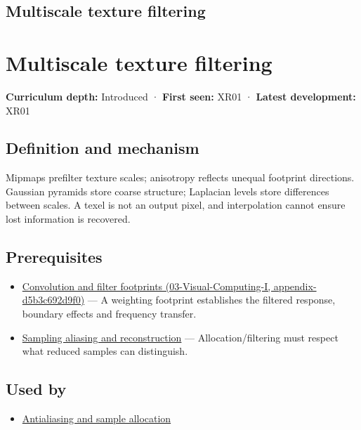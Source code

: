\hypertarget{appendix-b677a85ba76f}{}
\section*{Multiscale texture filtering}
\chapter{Multiscale texture filtering}\label{appendix-b677a85ba76f-multiscale-texture-filtering}

\textbf{Curriculum depth:} Introduced · \textbf{First seen:} XR01 · \textbf{Latest development:} XR01

\section{Definition and mechanism}\label{appendix-b677a85ba76f-definition-and-mechanism}

Mipmaps prefilter texture scales; anisotropy reflects unequal footprint directions. Gaussian pyramids store coarse structure; Laplacian levels store differences between scales. A texel is not an output pixel, and interpolation cannot ensure lost information is recovered.

\section{Prerequisites}\label{appendix-b677a85ba76f-prerequisites}

\begin{itemize}
\tightlist
\item
  \href{../03-Visual-Computing-I/main.pdf\#nameddest=appendix-d5b3c692d9f0}{Convolution and filter footprints (03-Visual-Computing-I, appendix-d5b3c692d9f0)} --- A weighting footprint establishes the filtered response, boundary effects and frequency transfer.
\item
  \hyperref[appendix-6a7869dd79a6]{Sampling aliasing and reconstruction} --- Allocation/filtering must respect what reduced samples can distinguish.
\end{itemize}

\section{Used by}\label{appendix-b677a85ba76f-used-by}

\begin{itemize}
\tightlist
\item
  \hyperref[appendix-4192b2bdd21e]{Antialiasing and sample allocation}
\end{itemize}

